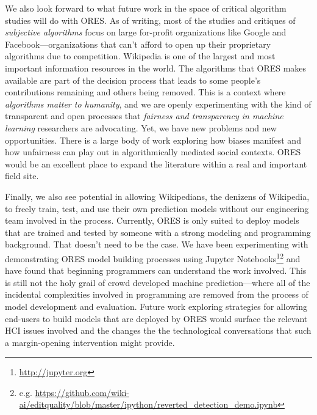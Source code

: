 We also look forward to what future work in the space of critical algorithm studies will do with ORES.  As of writing, most of the studies and critiques of \emph{subjective algorithms}\cite{tufekci2015algorithms} focus on large for-profit organizations like Google and Facebook---organizations that can't afford to open up their proprietary algorithms due to competition.  Wikipedia is one of the largest and most important information resources in the world.  The algorithms that ORES makes available are part of the decision process that leads to some people's contributions remaining and others being removed.  This is a context where \emph{algorithms matter to humanity}, and we are openly experimenting with the kind of transparent and open processes that \emph{fairness and transparency in machine learning} researchers are advocating.  Yet, we have new problems and new opportunities.  There is a large body of work exploring how biases manifest and how unfairness can play out in algorithmically mediated social contexts.  ORES would be an excellent place to expand the literature within a real and important field site.

Finally, we also see potential in allowing Wikipedians, the denizens of Wikipedia, to freely train, test, and use their own prediction models without our engineering team involved in the process.  Currently, ORES is only suited to deploy models that are trained and tested by someone with a strong modeling and programming background.  That doesn't need to be the case.  We have been experimenting with demonstrating ORES model building processes using Jupyter Notebooks\footnote{\url{http://jupyter.org}}\footnote{e.g. \url{ https://github.com/wiki-ai/editquality/blob/master/ipython/reverted_detection_demo.ipynb}} and have found that beginning programmers can understand the work involved.  This is still not the holy grail of crowd developed machine prediction---where all of the incidental complexities involved in programming are removed from the process of model development and evaluation.  Future work exploring strategies for allowing end-users to build models that are deployed by ORES would surface the relevant HCI issues involved and the changes the the technological conversations that such a margin-opening intervention might provide.
